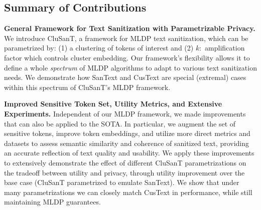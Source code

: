 \documentclass[11pt]{article}
\newcommand{\clusant}{CluSanT\xspace}
\begin{document}

\subsection{Summary of Contributions}

\noindent
\textbf{General Framework for Text Sanitization with Parametrizable Privacy. }  
    We introduce \clusant, a framework for MLDP text sanitization, which can be parametrized by: (1) a clustering of tokens of interest and (2) $k:$ amplification factor which controls cluster embedding. 
    Our framework's flexibility allows it to define a whole {\em spectrum} of MLDP algorithms to adapt to various text sanitization needs. 
    We demonstrate how SanText and CusText are special (extremal) cases within this spectrum of \clusant's MLDP framework.

\vspace{0.5em}
\noindent
\textbf{Improved Sensitive Token Set, Utility Metrics, and Extensive Experiments.} 
Independent of our MLDP framework, we made improvements that can also be applied to the SOTA. In particular, we augment the set of sensitive tokens, improve token embeddings, and utilize more direct metrics and datasets to assess semantic similarity and coherence of sanitized text, providing an accurate reflection of text quality and usability. 
We apply these improvements to extensively demonstrate the effect of different \clusant parametrizations on the tradeoff between  utility and privacy, through utility improvement over the base case (\clusant parametrized to emulate SanText). We show that under many parametrizations  we can closely match CusText in performance, while still maintaining MLDP guarantees.
    
\end{document}
